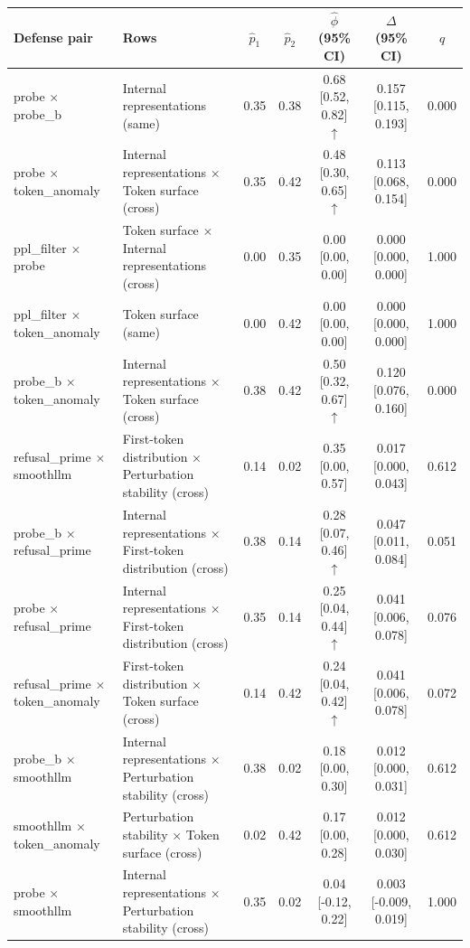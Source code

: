 \begin{tabular}{llccccc}
\toprule
Defense pair & Rows & $\hat p_1$ & $\hat p_2$ & $\hat\phi$ (95\% CI) & $\Delta$ (95\% CI) & $q$ \\
\midrule
probe $\times$ probe_b & Internal representations (same) & 0.35 & 0.38 & 0.68 [0.52, 0.82] $\uparrow$ & 0.157 [0.115, 0.193] & 0.000 \\
probe $\times$ token_anomaly & Internal representations $\times$ Token surface (cross) & 0.35 & 0.42 & 0.48 [0.30, 0.65] $\uparrow$ & 0.113 [0.068, 0.154] & 0.000 \\
ppl_filter $\times$ probe & Token surface $\times$ Internal representations (cross) & 0.00 & 0.35 & 0.00 [0.00, 0.00]  & 0.000 [0.000, 0.000] & 1.000 \\
ppl_filter $\times$ token_anomaly & Token surface (same) & 0.00 & 0.42 & 0.00 [0.00, 0.00]  & 0.000 [0.000, 0.000] & 1.000 \\
probe_b $\times$ token_anomaly & Internal representations $\times$ Token surface (cross) & 0.38 & 0.42 & 0.50 [0.32, 0.67] $\uparrow$ & 0.120 [0.076, 0.160] & 0.000 \\
refusal_prime $\times$ smoothllm & First-token distribution $\times$ Perturbation stability (cross) & 0.14 & 0.02 & 0.35 [0.00, 0.57]  & 0.017 [0.000, 0.043] & 0.612 \\
probe_b $\times$ refusal_prime & Internal representations $\times$ First-token distribution (cross) & 0.38 & 0.14 & 0.28 [0.07, 0.46] $\uparrow$ & 0.047 [0.011, 0.084] & 0.051 \\
probe $\times$ refusal_prime & Internal representations $\times$ First-token distribution (cross) & 0.35 & 0.14 & 0.25 [0.04, 0.44] $\uparrow$ & 0.041 [0.006, 0.078] & 0.076 \\
refusal_prime $\times$ token_anomaly & First-token distribution $\times$ Token surface (cross) & 0.14 & 0.42 & 0.24 [0.04, 0.42] $\uparrow$ & 0.041 [0.006, 0.078] & 0.072 \\
probe_b $\times$ smoothllm & Internal representations $\times$ Perturbation stability (cross) & 0.38 & 0.02 & 0.18 [0.00, 0.30]  & 0.012 [0.000, 0.031] & 0.612 \\
smoothllm $\times$ token_anomaly & Perturbation stability $\times$ Token surface (cross) & 0.02 & 0.42 & 0.17 [0.00, 0.28]  & 0.012 [0.000, 0.030] & 0.612 \\
probe $\times$ smoothllm & Internal representations $\times$ Perturbation stability (cross) & 0.35 & 0.02 & 0.04 [-0.12, 0.22]  & 0.003 [-0.009, 0.019] & 1.000 \\

\end{tabular}
